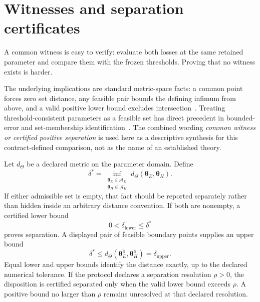 \section{Witnesses and separation certificates}

A common witness is easy to verify: evaluate both losses at the same retained
parameter and compare them with the frozen thresholds. Proving that no witness
exists is harder.

The underlying implications are standard metric-space facts: a common point
forces zero set distance, any feasible pair bounds the defining infimum from
above, and a valid positive lower bound excludes intersection~\cite{rudin1976}.
Treating threshold-consistent parameters as a feasible set has direct precedent
in bounded-error and set-membership identification~\cite{milaneseEtAl1996}.
The combined wording \emph{common witness or certified positive separation} is
used here as a descriptive synthesis for this contract-defined comparison, not
as the name of an established theory.

Let $d_{\Theta}$ be a declared metric on the parameter domain. Define
\begin{equation}
  \delta^{\ast}
  =
  \inf_{\substack{
    \boldsymbol\theta_E\in\mathcal A_E\\
    \boldsymbol\theta_H\in\mathcal A_H}}
  d_{\Theta}(\boldsymbol\theta_E,\boldsymbol\theta_H).
  \label{eq:admissible-set-separation}
\end{equation}
If either admissible set is empty, that fact should be reported separately
rather than hidden inside an arbitrary distance convention. If both are
nonempty, a certified lower bound
\begin{equation}
  0<\delta_{\mathrm{lower}}\leq\delta^{\ast}
\end{equation}
proves separation. A displayed pair of feasible boundary points supplies an
upper bound
\begin{equation}
  \delta^{\ast}
  \leq
  d_{\Theta}(\boldsymbol\theta_E^{\mathrm b},
             \boldsymbol\theta_H^{\mathrm b})
  =\delta_{\mathrm{upper}}.
\end{equation}
Equal lower and upper bounds identify the distance exactly, up to the declared
numerical tolerance. If the protocol declares a separation resolution
$\rho>0$, the disposition is certified separated only when the valid lower
bound exceeds $\rho$. A positive bound no larger than $\rho$ remains unresolved
at that declared resolution.

